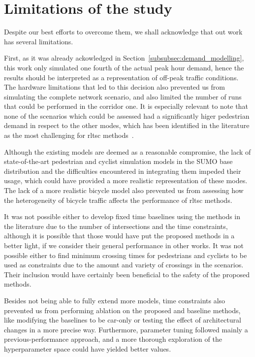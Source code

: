 \section{Limitations of the study}

Despite our best efforts to overcome them, we shall acknowledge that out work has several limitations.

\medskip

First, as it was already ackowledged in Section~\ref{subsubsec:demand_modelling}, this work only simulated one fourth of the actual peak hour demand, hence the results should be interpreted as a representation of off-peak traffic conditions. The hardware limitations that led to this decision also prevented us from simulating the complete network scenario, and also limited the number of runs that could be performed in the corridor one. It is especially relevant to note that none of the scenarios which could be assessed had a significantly higer pedestrian demand in respect to the other modes, which has been identified in the literature as the most challenging for \gls{rltsc} methods~\cite{Zhang2025}.

Although the existing models are deemed as a reasonable compromise, the lack of state-of-the-art pedestrian and cyclist simulation models in the SUMO base distribution and the difficulties encountered in integrating them impeded their usage, which could have provided a more realistic representation of these modes. The lack of a more realistic bicycle model also prevented us from assessing how the heterogeneity of bicycle traffic affects the performance of \gls{rltsc} methods.

It was not possible either to develop fixed time baselines using the methods in the literature due to the number of intersections and the time constraints, although it is possible that those would have put the proposed methods in a better light, if we consider their general performance in other works. It was not possible either to find minimum crossing times for pedestrians and cyclists to be used as constraints due to the amount and variety of crossings in the scenarios. Their inclusion would have certainly been beneficial to the safety of the proposed methods.

Besides not being able to fully extend more models, time constraints also prevented us from performing ablation on the proposed and baseline methods, like modifying the baselines to be car-only or testing the effect of architectural changes in a more precise way. Furthermore, parameter tuning followed mainly a previous-performance approach, and a more thorough exploration of the hyperparameter space could have yielded better values.

